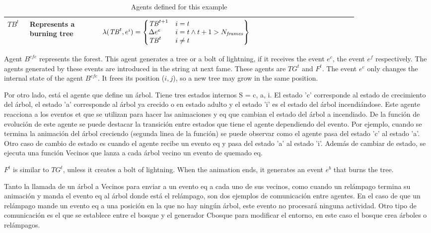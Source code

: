 \documentclass[runningheads]{llncs}
\begin{document}
\begin{table}[h]
\begin{center}
\begin{small}
\begin{tabular}{|p{0.05\linewidth}|p{0.17\linewidth}|p{0.6\linewidth}|}
	\hline

	$TB^{t}$ & Represents a burning tree &
	$\lambda
	(\mathit{TB}^{t},e^{i})=\left\{\begin{matrix}\mathit{TB}^{t+1}\hfill\null
	&i=t\hfill\null \\\Delta e^{e}\hfill\null &i=t\wedge
	t+1>N_{\mathit{frames}}\hfill\null \\\mathit{TB}^{t}\hfill\null &i\neq
	t\hfill\null \end{matrix}\right\}$ \\
	\hline

\end{tabular}
\end{small}
\caption{\label{table4} Agents defined for this example}
\end{center}
\end{table}



Agent $B^{cfe}$ represents the forest. This agent generates a tree or a bolt of lightning, if it receives the event $e^{c}$, the event $e^{f}$ respectively. The agents generated by these events are introduced in the string at next fame. These agents are $TG^{t}$ and $F^{t}$. The event $e^{e}$ only changes the internal state of the agent $B^{cfe}$. It frees its position ($i, j$), so a new tree may grow in the same position.

Por otro lado, está el agente que define un árbol. Tiene tres estados internos S = {c, a, i}. El estado 'c' corresponde al estado de crecimiento del árbol, el estado 'a' corresponde al árbol ya crecido o en estado adulto y el estado 'i' es el estado del árbol incendiándose. Este agente reacciona a los eventos et que se utilizan para hacer las animaciones y eq que cambian el estado del árbol a incendiado. De la función de evolución de este agente se puede destacar la transición entre estados que tiene el agente dependiendo del evento. Por ejemplo, cuando se termina la animación del árbol creciendo (segunda linea de la función) se puede observar como el agente pasa del estado 'c' al estado 'a'. Otro caso de cambio de estado es cuando el agente recibe un evento eq y pasa del estado 'a' al estado 'i'. Además de cambiar de estado, se ejecuta una función Vecinos que lanza a cada árbol vecino un evento de quemado eq.

$F^{t}$ is similar to $TG^{t}$, unless it creates a bolt of lightning. When the animation ends, it generates an event $e^{b}$ that burns the tree.

Tanto la llamada de un árbol a Vecinos para enviar a un evento eq a cada uno de sus vecinos, como cuando un relámpago termina su animación y manda el evento eq al árbol donde está el relámpago, son dos ejemplos de comunicación entre agentes. En el caso de que un relámpago mande un evento eq a una posición en la que no hay ningún árbol, este evento no procesará ninguna actividad. Otro tipo de comunicación es el que se establece entre el bosque y el generador Cbosque para modificar el entorno, en este caso el bosque crea árboles o relámpagos.
\end{document}
